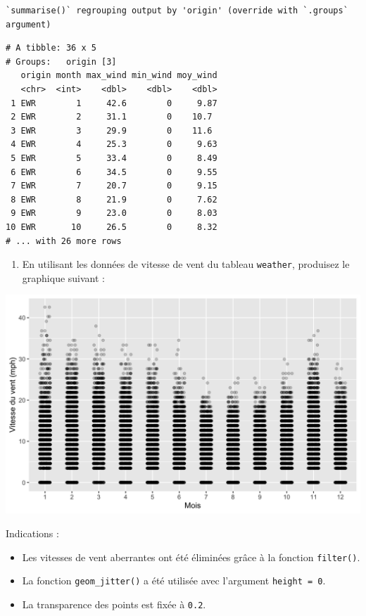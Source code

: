 \documentclass[
  a4paper,
]{article}
\providecommand{\tightlist}{%
  \setlength{\itemsep}{0pt}\setlength{\parskip}{0pt}}
\begin{document}
\begin{verbatim}
`summarise()` regrouping output by 'origin' (override with `.groups` argument)
\end{verbatim}

\begin{verbatim}
# A tibble: 36 x 5
# Groups:   origin [3]
   origin month max_wind min_wind moy_wind
   <chr>  <int>    <dbl>    <dbl>    <dbl>
 1 EWR        1     42.6        0     9.87
 2 EWR        2     31.1        0    10.7 
 3 EWR        3     29.9        0    11.6 
 4 EWR        4     25.3        0     9.63
 5 EWR        5     33.4        0     8.49
 6 EWR        6     34.5        0     9.55
 7 EWR        7     20.7        0     9.15
 8 EWR        8     21.9        0     7.62
 9 EWR        9     23.0        0     8.03
10 EWR       10     26.5        0     8.32
# ... with 26 more rows
\end{verbatim}

\begin{enumerate}
\def\labelenumi{\arabic{enumi}.}
\setcounter{enumi}{3}
\tightlist
\item
  En utilisant les données de vitesse de vent du tableau \texttt{weather}, produisez le graphique suivant :
\end{enumerate}

\begin{center}\includegraphics[width=0.9\linewidth]{figure/windspeed-1} \end{center}

Indications :

\begin{itemize}
\tightlist
\item
  Les vitesses de vent aberrantes ont été éliminées grâce à la fonction \texttt{filter()}.
\item
  La fonction \texttt{geom\_jitter()} a été utilisée avec l'argument \texttt{height\ =\ 0}.
\item
  La transparence des points est fixée à \texttt{0.2}.
\end{itemize}
\end{document}
